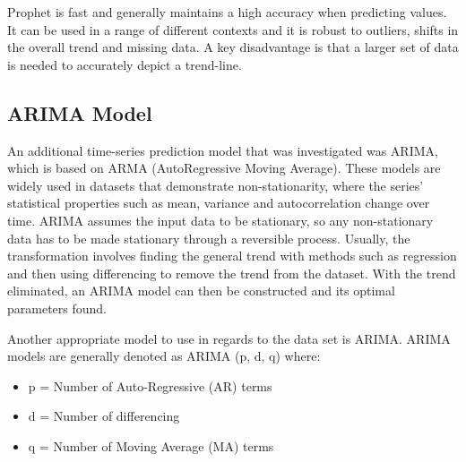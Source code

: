 \documentclass{mcmthesis}
\begin{document}
    \begin{center}
    \end{center}

    Prophet is fast and generally maintains a high accuracy when predicting values. It can be used in a range of different contexts and it is robust to outliers, shifts in the overall trend and missing data.  A key disadvantage is that a larger set of data is needed to accurately depict a trend-line.

    \subsection{ARIMA Model}
    An additional time-series prediction model that was investigated was ARIMA, which is based on ARMA (AutoRegressive Moving Average). These models are widely used in datasets that demonstrate non-stationarity, where the series’ statistical properties such as mean, variance and autocorrelation change over time. ARIMA assumes the input data to be stationary, so any non-stationary data has to be made stationary through a reversible process. Usually, the transformation involves finding the general trend with methods such as regression and then using differencing to remove the trend from the dataset. With the trend eliminated, an ARIMA model can then be constructed and its optimal parameters found. 

    Another appropriate model to use in regards to  the data set is ARIMA. ARIMA models are generally denoted as ARIMA (p, d, q) where:
    \begin{itemize}
        \item p = Number of Auto-Regressive (AR) terms 
        \item d = Number of differencing
        \item q = Number of Moving Average (MA) terms
    \end{itemize}
    
\end{document}
